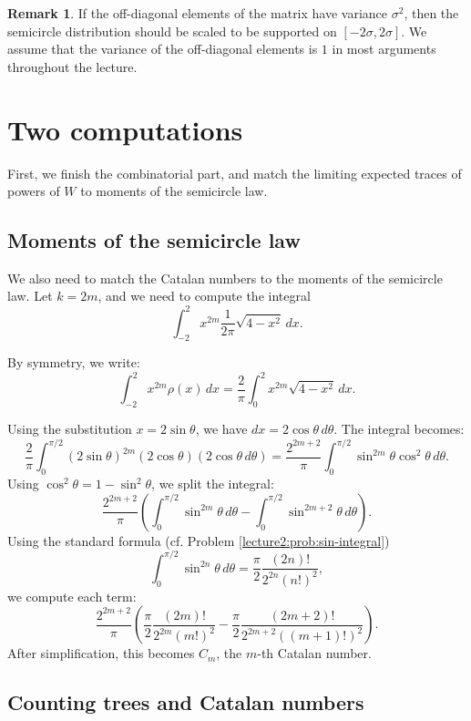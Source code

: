\documentclass[letterpaper,11pt,oneside,reqno]{book}
\numberwithin{equation}{chapter}  %
\theoremstyle{definition}
\newtheorem{remark}[proposition]{Remark}
\begin{document}
\begin{remark}
	If the off-diagonal elements of the matrix have variance $\sigma^2$, then the
	semicircle distribution should be scaled to be supported on $[-2\sigma,2\sigma]$.
	We assume that the variance of the off-diagonal elements is $1$
	in most arguments throughout the lecture.
\end{remark}

\section{Two computations}

First, we finish the combinatorial part,
and match the limiting expected traces of powers of $W$
to moments of the semicircle law.

\subsection{Moments of the semicircle law}

We also need to match the Catalan numbers to the moments of the semicircle law.
Let $k=2m$, and we need to compute
the integral
\begin{equation*}
	\int_{-2}^{2} x^{2m} \frac{1}{2\pi} \sqrt{4-x^2} \, dx.
\end{equation*}

By symmetry, we write:
\[
\int_{-2}^2 x^{2m}\rho(x)\, dx = \frac{2}{\pi} \int_0^2 x^{2m} \sqrt{4-x^2}\, dx.
\]

Using the substitution \(x = 2\sin\theta\), we have \(dx = 2\cos\theta\, d\theta\). The integral becomes:
\[
\frac{2}{\pi} \int_0^{\pi/2} (2\sin\theta)^{2m} (2\cos\theta) (2\cos\theta\, d\theta)
= \frac{2^{2m+2}}{\pi} \int_0^{\pi/2} \sin^{2m}\theta \cos^2\theta\, d\theta.
\]
Using \(\cos^2\theta = 1 - \sin^2\theta\), we split the integral:
\[
\frac{2^{2m+2}}{\pi} \left( \int_0^{\pi/2} \sin^{2m}\theta\, d\theta - \int_0^{\pi/2} \sin^{2m+2}\theta\, d\theta \right).
\]
Using the standard formula (cf. Problem \ref{lecture2:prob:sin-integral})
\begin{equation}
	\label{lecture2:eq:sin-integral}
\int_0^{\pi/2} \sin^{2n}\theta\, d\theta = \frac{\pi}{2} \frac{(2n)!}{2^{2n} (n!)^2},
\end{equation}
we compute each term:
\[
\frac{2^{2m+2}}{\pi} \left( \frac{\pi}{2} \frac{(2m)!}{2^{2m}(m!)^2} - \frac{\pi}{2} \frac{(2m+2)!}{2^{2m+2}((m+1)!)^2} \right).
\]
After simplification, this becomes
$C_m$, the $m$-th Catalan number.

\subsection{Counting trees and Catalan numbers}
\end{document}
